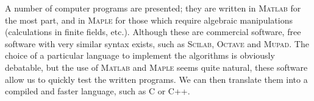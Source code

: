 

  A number of computer programs are presented; they are written in \textsc{Matlab} for the most part, and in \textsc{Maple} for those which require algebraic manipulations (calculations in finite fields, etc.). Although these are commercial software, free software with very similar syntax exists, such as  \textsc{Scilab}, \textsc{Octave} and \textsc{Mupad}. 
% 
The choice of a particular language to implement the algorithms is obviously debatable, but the use of \textsc{Matlab} and \textsc{Maple} seems quite natural, these software allow us to quickly test the written programs. We can then translate them into a compiled and faster language, such as C or C++. 
%
%



